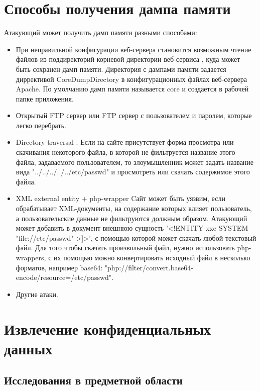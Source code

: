 \documentclass[20pt]{article}
\begin{document}
\newpage

\section{Способы получения дампа памяти}

Атакующий может получить дамп памяти разными способами:
\begin{itemize}
  \item При неправильной конфигурации веб-сервера становится возможным чтение
  файлов из поддиректорий корневой директории веб-сервиса \cite{directory-listing},
  куда может быть сохранен дамп памяти. Директория с дампами памяти задается
  диррективой CoreDumpDirectory в конфигурационных файлах веб-сервера Apache.
  По умолчанию дамп памяти называется core и создается в рабочей папке приложения.
  \item Открытый FTP сервер или FTP сервер с пользователем и паролем, которые
  легко перебрать.
  \item Directory traversal \cite{directory-traversal}.
  Если на сайте присутствует форма просмотра или скачивания некоторого файла,
  в которой не фильтруется название этого файла, задаваемого пользователем, то
  злоумышленник может задать название вида "../../../../../etc/passwd" и просмотреть
  или скачать содержимое этого файла.
  \item XML external entity \cite{xxe} + php-wrapper \cite{php-wrappers}
  Cайт может быть уязвим, если обрабатывает XML-документы, на содержание которых
  влияет пользователь, а пользовательские данные не фильтруются должным образом.
  Атакующий может добавить в документ внешнюю сущность '<!ENTITY xxe SYSTEM "file://etc/passwd" >]>',
  с помощью которой может скачать любой текстовый файл. Для того чтобы скачать
  произвольный файл, нужно использовать php-wrappers, с их помощью можно
  конвертировать исходный файл в несколько форматов, например base64:
  "php://filter/convert.base64-encode/resource=/etc/passwd".
  \item Другие атаки.
\end{itemize}

\section{Извлечение конфиденциальных данных}

\subsection{Исследования в предметной области}
\end{document}
